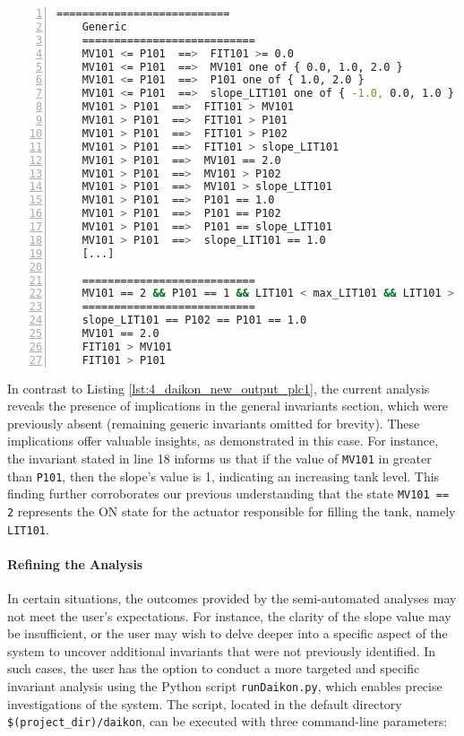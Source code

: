 \begin{lstlisting}[language=bash,numbers=left,caption={Daikon outcomes for the system configuration \texttt{MV101 == 2, P101 == 1} on \texttt{LIT101}},label=lst:4_current_system_config_analysis]
	===========================
	Generic
	===========================
	MV101 <= P101  ==>  FIT101 >= 0.0
	MV101 <= P101  ==>  MV101 one of { 0.0, 1.0, 2.0 }
	MV101 <= P101  ==>  P101 one of { 1.0, 2.0 }
	MV101 <= P101  ==>  slope_LIT101 one of { -1.0, 0.0, 1.0 }
	MV101 > P101  ==>  FIT101 > MV101
	MV101 > P101  ==>  FIT101 > P101
	MV101 > P101  ==>  FIT101 > P102
	MV101 > P101  ==>  FIT101 > slope_LIT101
	MV101 > P101  ==>  MV101 == 2.0
	MV101 > P101  ==>  MV101 > P102
	MV101 > P101  ==>  MV101 > slope_LIT101
	MV101 > P101  ==>  P101 == 1.0
	MV101 > P101  ==>  P101 == P102
	MV101 > P101  ==>  P101 == slope_LIT101
	MV101 > P101  ==>  slope_LIT101 == 1.0
	[...]
	
	===========================
	MV101 == 2 && P101 == 1 && LIT101 < max_LIT101 && LIT101 > min_LIT101
	===========================
	slope_LIT101 == P102 == P101 == 1.0
	MV101 == 2.0
	FIT101 > MV101
	FIT101 > P101
\end{lstlisting}

\noindent In contrast to Listing \ref{lst:4_daikon_new_output_plc1}, the current analysis reveals the presence of implications in the general invariants section, which were previously absent (remaining generic invariants omitted for brevity). These implications offer valuable insights, as demonstrated in this case. For instance, the invariant stated in line 18 informs us that if the value of \texttt{MV101} in greater than \texttt{P101}, then the slope's value is 1, indicating an increasing tank level. This finding further corroborates our previous understanding that the state \texttt{MV101 == 2} represents the ON state for the actuator responsible for filling the tank, namely \texttt{LIT101}. 

\paragraph{Refining the Analysis}
\label{par:4_refining_analysis}
In certain situations, the outcomes provided by the semi-automated analyses may not meet the user's expectations. For instance, the clarity of the slope value may be insufficient, or the user may wish to delve deeper into a specific aspect of the system to uncover additional invariants that were not previously identified. In such cases, the user has the option to conduct a more targeted and specific invariant analysis using the Python script \texttt{runDaikon.py}, which enables precise investigations of the system.\newline
The script, located in the default directory \texttt{\$(project\_dir)/daikon}, can be executed with three command-line parameters:

